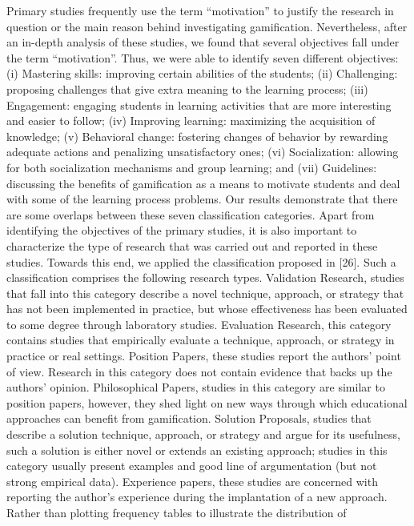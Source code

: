 Primary studies frequently use the term “motivation” to justify the
research in question or the main reason behind investigating
gamification. Nevertheless, after an in-depth analysis of these
studies, we found that several objectives fall under the term
“motivation”. Thus, we were able to identify seven different
objectives: (i) Mastering skills: improving certain abilities of the
students; (ii) Challenging: proposing challenges that give extra
meaning to the learning process; (iii) Engagement: engaging
students in learning activities that are more interesting and easier to
follow; (iv) Improving learning: maximizing the acquisition of
knowledge; (v) Behavioral change: fostering changes of behavior
by rewarding adequate actions and penalizing unsatisfactory ones;
(vi) Socialization: allowing for both socialization mechanisms and
group learning; and (vii) Guidelines: discussing the benefits of
gamification as a means to motivate students and deal with some of
the learning process problems. Our results demonstrate that there
are some overlaps between these seven classification categories.
Apart from identifying the objectives of the primary studies, it is
also important to characterize the type of research that was carried
out and reported in these studies. Towards this end, we applied the
classification proposed in [26]. Such a classification comprises the
following research types.
Validation Research, studies that fall into this category describe a
novel technique, approach, or strategy that has not been
implemented in practice, but whose effectiveness has been
evaluated to some degree through laboratory studies.
Evaluation Research, this category contains studies that
empirically evaluate a technique, approach, or strategy in practice
or real settings.
Position Papers, these studies report the authors' point of view.
Research in this category does not contain evidence that backs up
the authors' opinion.
Philosophical Papers, studies in this category are similar to
position papers, however, they shed light on new ways through
which educational approaches can benefit from gamification.
Solution Proposals, studies that describe a solution technique,
approach, or strategy and argue for its usefulness, such a solution
is either novel or extends an existing approach; studies in this
category usually present examples and good line of argumentation
(but not strong empirical data). 
Experience papers, these studies are concerned with reporting the
author's experience during the implantation of a new approach.
Rather than plotting frequency tables to illustrate the distribution of
